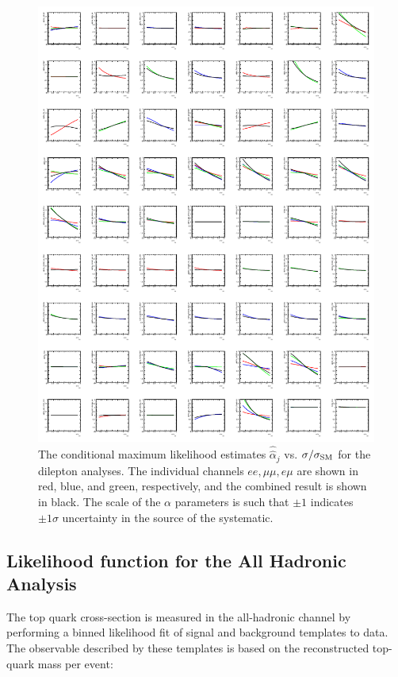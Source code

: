  \begin{figure}[htbp]
   \begin{center}
     \includegraphics[width=.8\textwidth]{figures/comb/DilepProfilePlots}
    \caption{The conditional maximum likelihood estimates $\hat{\hat{\alpha}}_j$ vs. $\sigma/\sigma_{\rm SM}$ for the dilepton analyses.  The individual channels $ee, \mu\mu, e\mu$ are shown in red, blue, and green, respectively, and the combined result is shown in black.  The scale of the $\alpha$ parameters is such that $\pm 1$ indicates $\pm 1\sigma$ uncertainty in the source of the systematic.}
     \label{fig:dilepton_profile}
   \end{center}
 \end{figure}


\subsection{Likelihood function for the All Hadronic Analysis}
\label{sec:allhad}

The top quark cross-section is measured in the all-hadronic channel by performing a binned likelihood fit of signal and background templates to data.
The observable described by these templates is based on the reconstructed top-quark mass per event:

